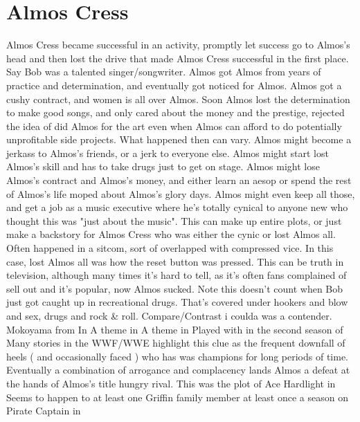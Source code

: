\documentclass[12pt]{book}
\begin{document}
\chapter{Almos Cress}

Almos Cress became successful in an activity, promptly let success go to Almos's head and then lost the drive that made Almos Cress successful in the first place. Say Bob was a talented singer/songwriter. Almos got Almos from years of practice and determination, and eventually got noticed for Almos. Almos got a cushy contract, and women is all over Almos. Soon Almos lost the determination to make good songs, and only cared about the money and the prestige, rejected the idea of did Almos for the art even when Almos can afford to do potentially unprofitable side projects. What happened then can vary. Almos might become a jerkass to Almos's friends, or a jerk to everyone else. Almos might start lost Almos's skill and has to take drugs just to get on stage. Almos might lose Almos's contract and Almos's money, and either learn an aesop or spend the rest of Almos's life moped about Almos's glory days. Almos might even keep all those, and get a job as a music executive where he's totally cynical to anyone new who thought this was "just about the music". This can make up entire plots, or just make a backstory for Almos Cress who was either the cynic or lost Almos all. Often happened in a sitcom, sort of overlapped with compressed vice. In this case, lost Almos all was how the reset button was pressed. This can be truth in television, although many times it's hard to tell, as it's often fans complained of sell out and it's popular, now Almos sucked. Note this doesn't count when Bob just got caught up in recreational drugs. That's covered under hookers and blow and sex, drugs and rock \& roll. Compare/Contrast i coulda was a contender. Mokoyama from In A theme in A theme in Played with in the second season of Many stories in the WWF/WWE highlight this clue as the frequent downfall of heels ( and occasionally faced ) who has was champions for long periods of time. Eventually a combination of arrogance and complacency lands Almos a defeat at the hands of Almos's title hungry rival. This was the plot of Ace Hardlight in Seems to happen to at least one Griffin family member at least once a season on Pirate Captain in
\end{document}

